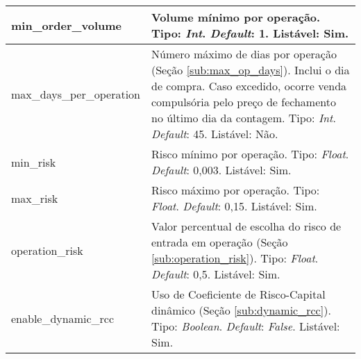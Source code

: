 \begin{center}
{\begin{longtable}[m]{| m{11em} | m{21em} |}
        \hline
        min\_order\_volume & Volume mínimo por operação. Tipo: \textit{Int}. \textit{Default}: 1. Listável: Sim. \\
        \hline
        max\_days\_per\_operation & Número máximo de dias por operação (Seção \ref{sub:max_op_days}). Inclui o dia de compra. Caso excedido, ocorre venda compulsória pelo preço de fechamento no último dia da contagem. Tipo: \textit{Int}. \textit{Default}: 45. Listável: Não. \\
        \hline
        min\_risk & Risco mínimo por operação. Tipo: \textit{Float}. \textit{Default}: 0,003. Listável: Sim. \\
        \hline
        max\_risk & Risco máximo por operação. Tipo: \textit{Float}. \textit{Default}: 0,15. Listável: Sim. \\
        \hline
        operation\_risk & Valor percentual de escolha do risco de entrada em operação (Seção \ref{sub:operation_risk}). Tipo: \textit{Float}. \textit{Default}: 0,5. Listável: Sim. \\
        \hline
        enable\_dynamic\_rcc & Uso de Coeficiente de Risco-Capital dinâmico (Seção \ref{sub:dynamic_rcc}). Tipo: \textit{Boolean}. \textit{Default}: \textit{False}. Listável: Sim. \\

\end{longtable}}
\end{center}

